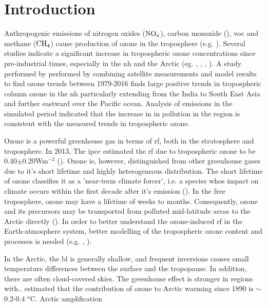 \chapter{Introduction} \label{ch:introduction}
Anthropogenic emissions of nitrogen oxides ($\mathrm{NO_x}$), carbon monoxide (), \acrfull{voc} and methane ($\mathrm{CH_4}$) cause production of ozone in the troposphere (e.g. \cite{SeinfeldSpyros}). Several studies indicate a significant increase in tropospheric ozone concentrations since pre-industrial times, especially in the \acrfull{nh} and the Arctic (eg. \cite{WangJacob1998}, \cite{Shindell2007}, \cite{Parrish2014}, \cite{AMAP2015}). A study performed by \cite{ZIEMKE2019} performed by combining satellite measurements and model results to find ozone trends between 1979-2016 finds large positive trends in tropospheric column ozone in the \acrshort{nh} particularly extending from the India to South East Asia and further eastward over the Pacific ocean. Analysis of  emissions in the simulated period indicated that the increase in in pollution in the region is consistent with the measured trends in tropospheric ozone.  

\medskip

Ozone is a powerful greenhouse gas in terms of \acrfull{rf}, both in the stratosphere and troposphere. In 2013, The \acrfull{ipcc} estimated the \acrshort{rf} due to tropospheric ozone to be 0.40$\pm$0.20Wm$^{-2}$ (\cite{IPCCchapter8}). Ozone is, however, distinguished from other greenhouse gases due to it's short lifetime and highly heterogeneous distribution. The short lifetime of ozone classifies it as a 'near-term climate forcer', i.e. a species whos impact on climate occurs within the first decade after it's emission (\cite{IPCCchapter8}). In the free troposphere, ozone may have a lifetime of weeks to months. Consequently, ozone and its precursors may be transported from polluted mid-latitude areas to the Arctic directly (\cite{AMAP2015}). In order to better understand the ozone-induced \acrshort{rf} in the Earth-atmosphere system, better modelling of the tropospheric ozone content and processes is needed (e.g. \cite{Bowman2013}, \cite{Parella}). 

\medskip

In the Arctic, the \acrfull{bl} is generally shallow, and frequent inversions causes small temperature differences between the surface and the tropopause. In addition, there are often cloud-covered skies. The greenhouse effect is stronger in regions with.. \cite{Shindell2009} estimated that the contribution of ozone to Arctic warming since 1890 is $\sim$0.2-0.4 $^o$C. Arctic amplification  

